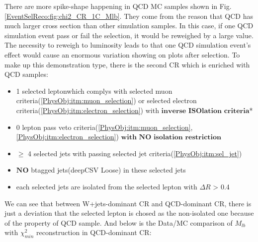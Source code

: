 		There are more spike-shape happening in QCD MC samples shown in Fig.\ref{EventSelReco:fig:chi2_CR_1C_Mlb}. They come from the reason that QCD has much larger cross section than other simulation samples. In this case, if one QCD simulation event pass or fail the selection, it would be reweighed by a large value. The necessity to reweigh to luminosity leads to that one QCD simulation event's effect would cause an enormous variation showing on plots after selection. To make up this demonstration type, there is the second CR which is enriched with QCD samples:

		\begin{itemize}
	  		\item 1 selected leptonwhich complys with selected muon criteria(\ref{PhysObj:itm:muon_selection}) or selected electron criteria(\ref{PhysObj:itm:electron_selection}) with $\textbf{inverse ISOlation criteria}$*
	  		\item 0 lepton pass veto criteria(\ref{PhysObj:itm:muon_selection},\ref{PhysObj:itm:electron_selection}) $\textbf{with NO isolation restriction}$
	  		\item $\geq$ 4 selected jets with passing selected jet criteria(\ref{PhysObj:itm:sel_jet})
	  		\item $\textbf{NO}$ btagged jets(deepCSV Loose) in these selected jets
	  		\item each selected jets are isolated from the selected lepton with $\Delta R$ > 0.4
	  	\label{EventSelReco:itm:full_sel_CR2}
		\end{itemize}

		We can see that between W+jets-dominant CR and QCD-dominant CR, there is just a deviation that the selected lepton is chosed as the non-isolated one because of the property of QCD sample. And below is the Data/MC comparison of $M_{lb}$ with $\chi^2_{min}$ reconstruction in QCD-dominant CR:

